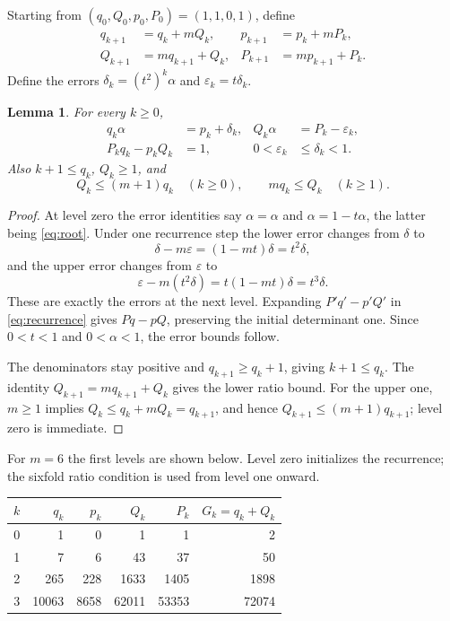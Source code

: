 \documentclass[11pt]{article}
\newtheorem{lemma}[theorem]{Lemma}
\theoremstyle{remark}
\begin{document}
Starting from $(q_0,Q_0,p_0,P_0)=(1,1,0,1)$, define
\begin{equation}\label{eq:recurrence}
\begin{aligned}
q_{k+1}&=q_k+mQ_k,&p_{k+1}&=p_k+mP_k,\\
Q_{k+1}&=mq_{k+1}+Q_k,&P_{k+1}&=mp_{k+1}+P_k.
\end{aligned}
\end{equation}
Define the errors $\delta_k=(t^2)^k\alpha$ and
$\varepsilon_k=t\delta_k$.

\begin{lemma}\label{lem:recurrence}
For every $k\ge0$,
\begin{align}
q_k\alpha&=p_k+\delta_k,&
Q_k\alpha&=P_k-\varepsilon_k,\label{eq:errors}\\
P_kq_k-p_kQ_k&=1,&
0<\varepsilon_k&\le\delta_k<1.\label{eq:invariants}
\end{align}
Also $k+1\le q_k$, $Q_k\ge1$, and
\begin{equation}\label{eq:ratios}
Q_k\le(m+1)q_k\quad(k\ge0),\qquad
mq_k\le Q_k\quad(k\ge1).
\end{equation}
\end{lemma}
\begin{proof}
At level zero the error identities say $\alpha=\alpha$ and
$\alpha=1-t\alpha$, the latter being \eqref{eq:root}. Under one
recurrence step the lower error changes from $\delta$ to
\[
\delta-m\varepsilon=(1-mt)\delta=t^2\delta,
\]
and the upper error changes from $\varepsilon$ to
\[
\varepsilon-m(t^2\delta)=t(1-mt)\delta=t^3\delta.
\]
These are exactly the errors at the next level. Expanding
$P'q'-p'Q'$ in \eqref{eq:recurrence} gives $Pq-pQ$, preserving the
initial determinant one. Since $0<t<1$ and $0<\alpha<1$, the error
bounds follow.

The denominators stay positive and $q_{k+1}\ge q_k+1$, giving
$k+1\le q_k$. The identity $Q_{k+1}=mq_{k+1}+Q_k$ gives the lower ratio
bound. For the upper one, $m\ge1$ implies
$Q_k\le q_k+mQ_k=q_{k+1}$, and hence
$Q_{k+1}\le(m+1)q_{k+1}$; level zero is immediate.
\end{proof}

For $m=6$ the first levels are shown below. Level zero initializes the
recurrence; the sixfold ratio condition is used from level one onward.
\begin{center}
\begin{tabular}{rrrrrr}
\toprule
$k$&$q_k$&$p_k$&$Q_k$&$P_k$&$G_k=q_k+Q_k$\\
\midrule
0&1&0&1&1&2\\
1&7&6&43&37&50\\
2&265&228&1633&1405&1898\\
3&10063&8658&62011&53353&72074\\
\bottomrule
\end{tabular}
\end{center}
\end{document}
